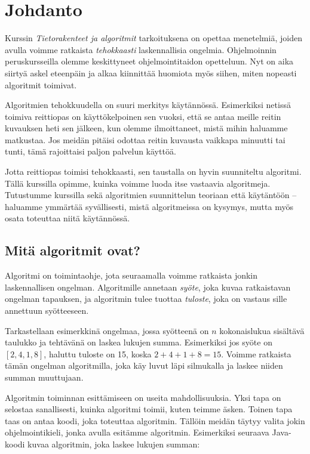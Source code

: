 \chapter{Johdanto}

Kurssin \emph{Tietorakenteet ja algoritmit} tarkoituksena
on opettaa menetelmiä, joiden avulla voimme ratkaista
\emph{tehokkaasti} laskennallisia ongelmia.
Ohjelmoinnin peruskursseilla olemme keskittyneet
ohjelmointitaidon opetteluun.
Nyt on aika siirtyä askel eteenpäin ja alkaa kiinnittää
huomiota myös siihen, miten nopeasti algoritmit toimivat.

Algoritmien tehokkuudella on suuri merkitys käytännössä.
Esimerkiksi netissä toimiva reittiopas on käyttökelpoinen sen vuoksi,
että se antaa meille reitin kuvauksen heti sen jälkeen, kun olemme
ilmoittaneet, mistä mihin haluamme matkustaa.
Jos meidän pitäisi odottaa reitin kuvausta vaikkapa minuutti tai tunti,
tämä rajoittaisi paljon palvelun käyttöä.

Jotta reittiopas toimisi tehokkaasti, sen taustalla on
hyvin suunniteltu algoritmi.
Tällä kurssilla opimme, kuinka voimme luoda itse vastaavia algoritmeja.
Tutustumme kurssilla sekä algoritmien suunnittelun teoriaan että
käytäntöön -- haluamme ymmärtää syvällisesti, mistä algoritmeissa on kysymys,
mutta myös osata toteuttaa niitä käytännössä.

\section{Mitä algoritmit ovat?}


Algoritmi on toimintaohje, jota seuraamalla voimme ratkaista
jonkin laskennallisen ongelman.
Algoritmille annetaan \emph{syöte},
joka kuvaa ratkaistavan ongelman tapauksen,
ja algoritmin tulee tuottaa \emph{tuloste},
joka on vastaus sille annettuun syötteeseen.

Tarkastellaan esimerkkinä ongelmaa,
jossa syötteenä on $n$ kokonaislukua sisältävä taulukko ja
tehtävänä on laskea lukujen summa.
Esimerkiksi jos syöte on $[2,4,1,8]$,
haluttu tuloste on 15, koska $2+4+1+8=15$.
Voimme ratkaista tämän ongelman algoritmilla,
joka käy luvut läpi silmukalla ja laskee niiden
summan muuttujaan.

Algoritmin toiminnan esittämiseen on useita mahdollisuuksia.
Yksi tapa on selostaa sanallisesti, kuinka algoritmi toimii,
kuten teimme äsken.
Toinen tapa taas on antaa koodi, joka toteuttaa algoritmin.
Tällöin meidän täytyy valita jokin ohjelmointikieli,
jonka avulla esitämme algoritmin.
Esimerkiksi seuraava Java-koodi kuvaa algoritmin,
joka laskee lukujen summan:

